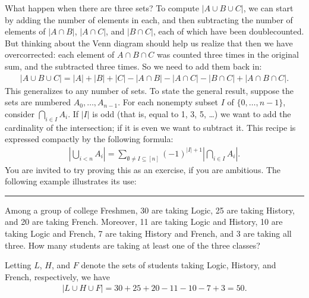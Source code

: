 \documentclass[letterpaper,10pt,english]{sphinxmanual}
\begin{document}
\sphinxAtStartPar
What happen when there are three sets? To compute \(|A \cup B \cup C|\), we can start by adding the number of elements in each, and then subtracting the number of elements of \(| A \cap B |\), \(|A \cap C|\), and \(|B \cap C|\), each of which have been double\sphinxhyphen{}counted. But thinking about the Venn diagram should help us realize that then we have over\sphinxhyphen{}corrected: each element of \(A \cap B \cap C\) was counted three times in the original sum, and the subtracted three times. So we need to add them back in:
\begin{equation*}
\begin{split}| A \cup B \cup C | = | A | + | B | + | C | - | A \cap B | - | A \cap C | - | B \cap C | + | A \cap B \cap C |.\end{split}
\end{equation*}
\sphinxAtStartPar
This generalizes to any number of sets. To state the general result, suppose the sets are numbered \(A_0, \ldots, A_{n-1}\). For each nonempty subset \(I\) of \(\{0, \ldots, n-1 \}\), consider \(\bigcap_{i \in I} A_i\). If \(|I|\) is odd (that is, equal to 1, 3, 5, …) we want to add the cardinality of the intersection; if it is even we want to subtract it. This recipe is expressed compactly by the following formula:
\begin{equation*}
\begin{split}\left| \bigcup_{i < n} A_i \right| = \sum_{\emptyset \ne I \subseteq [n]} (-1)^{|I|+1} \left| \bigcap_{i \in I} A_i \right| .\end{split}
\end{equation*}
\sphinxAtStartPar
You are invited to try proving this as an exercise, if you are ambitious. The following example illustrates its use:


\bigskip\hrule\bigskip


\sphinxAtStartPar
{} Among a group of college Freshmen, 30 are taking Logic, 25 are taking History, and 20 are taking French. Moreover, 11 are taking Logic and History, 10 are taking Logic and French, 7 are taking History and French, and 3 are taking all three. How many students are taking at least one of the three classes?

\sphinxAtStartPar
{} Letting \(L\), \(H\), and \(F\) denote the sets of students taking Logic, History, and French, respectively, we have
\begin{equation*}
\begin{split}| L \cup H \cup F | = 30 + 25 + 20 - 11 - 10 - 7 + 3 = 50.\end{split}
\end{equation*}
\end{document}
